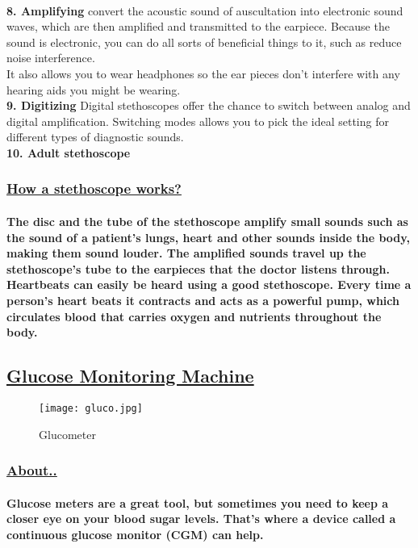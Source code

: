 \documentclass[12pt]{article}
\begin{document}
{    	\\\textbf{8. Amplifying} convert the acoustic sound of auscultation into electronic sound waves, which are then amplified and transmitted to the earpiece. Because the sound is electronic, you can do all sorts of beneficial things to it, such as reduce noise interference. \\It also allows you to wear headphones so the ear pieces don’t interfere with any hearing aids you might be wearing.
    	\\\textbf{9. Digitizing} Digital stethoscopes offer the chance to switch between analog and digital amplification. Switching modes allows you to pick the ideal setting for different types of diagnostic sounds.
    	\\\textbf{10. Adult stethoscope}}
    	\subsubsection{\underline{How a stethoscope works?}}
    	\paragraph{The disc and the tube of the stethoscope amplify small sounds such as the sound of a patient's lungs, heart and other sounds inside the body, making them sound louder. The amplified sounds travel up the stethoscope's tube to the earpieces that the doctor listens through. Heartbeats can easily be heard using a good stethoscope. Every time a person's heart beats it contracts and acts as a powerful pump, which circulates blood that carries oxygen and nutrients throughout the body.
    	}
    \clearpage
    \subsection{\underline{Glucose Monitoring Machine} }
     \begin{figure}[h]
    	\texttt{[image: gluco.jpg]}
    	\caption{Glucometer}
    \end{figure}
    \subsubsection{\underline{About..}}
    \paragraph{Glucose meters are a great tool, but sometimes you need to keep a closer eye on your blood sugar levels. That's where a device called a continuous glucose monitor (CGM) can help.
    }
\end{document}

